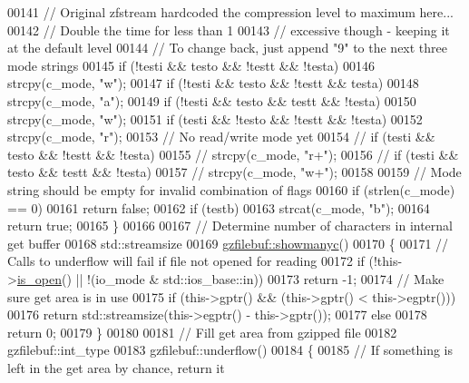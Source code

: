 \begin{DoxyCode}
00141   \textcolor{comment}{// Original zfstream hardcoded the compression level to maximum here...}
00142   \textcolor{comment}{// Double the time for less than 1%
00143   \textcolor{comment}{// excessive though - keeping it at the default level}
00144   \textcolor{comment}{// To change back, just append "9" to the next three mode strings}
00145   \textcolor{keywordflow}{if} (!testi && testo && !testt && !testa)
00146     strcpy(c\_mode, \textcolor{stringliteral}{"w"});
00147   \textcolor{keywordflow}{if} (!testi && testo && !testt && testa)
00148     strcpy(c\_mode, \textcolor{stringliteral}{"a"});
00149   \textcolor{keywordflow}{if} (!testi && testo && testt && !testa)
00150     strcpy(c\_mode, \textcolor{stringliteral}{"w"});
00151   \textcolor{keywordflow}{if} (testi && !testo && !testt && !testa)
00152     strcpy(c\_mode, \textcolor{stringliteral}{"r"});
00153   \textcolor{comment}{// No read/write mode yet}
00154 \textcolor{comment}{//  if (testi && testo && !testt && !testa)}
00155 \textcolor{comment}{//    strcpy(c\_mode, "r+");}
00156 \textcolor{comment}{//  if (testi && testo && testt && !testa)}
00157 \textcolor{comment}{//    strcpy(c\_mode, "w+");}
00158 
00159   \textcolor{comment}{// Mode string should be empty for invalid combination of flags}
00160   \textcolor{keywordflow}{if} (strlen(c\_mode) == 0)
00161     \textcolor{keywordflow}{return} \textcolor{keyword}{false};
00162   \textcolor{keywordflow}{if} (testb)
00163     strcat(c\_mode, \textcolor{stringliteral}{"b"});
00164   \textcolor{keywordflow}{return} \textcolor{keyword}{true};
00165 \}
00166 
00167 \textcolor{comment}{// Determine number of characters in internal get buffer}
00168 std::streamsize
00169 \hyperlink{classgzfilebuf_afbe2418d8a9c3f4a321cc26aa4ae5f7a}{gzfilebuf::showmanyc}()
00170 \{
00171   \textcolor{comment}{// Calls to underflow will fail if file not opened for reading}
00172   \textcolor{keywordflow}{if} (!this->\hyperlink{classgzofstream_acb1c9c6dccaf41bc5e44c2263ea48de3}{is\_open}() || !(io\_mode & std::ios\_base::in))
00173     \textcolor{keywordflow}{return} -1;
00174   \textcolor{comment}{// Make sure get area is in use}
00175   \textcolor{keywordflow}{if} (this->gptr() && (this->gptr() < this->egptr()))
00176     \textcolor{keywordflow}{return} std::streamsize(this->egptr() - this->gptr());
00177   \textcolor{keywordflow}{else}
00178     \textcolor{keywordflow}{return} 0;
00179 \}
00180 
00181 \textcolor{comment}{// Fill get area from gzipped file}
00182 gzfilebuf::int\_type
00183 gzfilebuf::underflow()
00184 \{
00185   \textcolor{comment}{// If something is left in the get area by chance, return it}
}
\end{DoxyCode}
